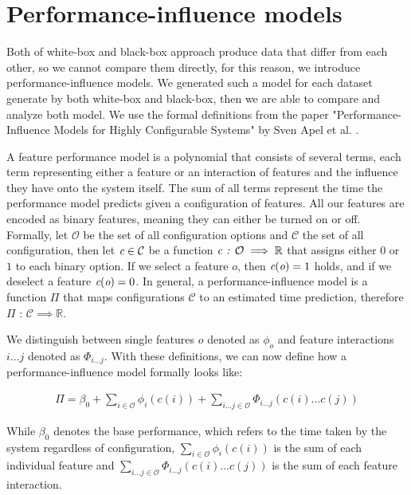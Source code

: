 \section{Performance-influence models}\label{ch:performance-influence-models}

Both of white-box and black-box approach produce data that differ from each other, so we cannot compare them directly, for 
this reason, we introduce performance-influence models. We generated such a model for each dataset generate by both white-box and black-box, then
we are able to compare and analyze both model. We use the formal definitions from the paper "Performance-Influence Models for
Highly Configurable Systems" by Sven Apel et al. \cite{Performance-influence-models-for-highly-configurable-systems}.

A feature performance model is a polynomial that consists of several terms, each term representing either a feature or an interaction
of features and the influence they have onto the system itself. The sum of all terms represent the time the performance model predicts
given a configuration of features. All our features are encoded as binary features, meaning they can either be turned on or off. Formally, 
let $\mathcal{O}$ be the set of all configuration options and $\mathcal{C}$ the set of all configuration, then  let $\emph{c} \in \mathcal{C}$ be
a function $\emph{c} \textit{ : } \mathcal{O} \implies \mathbb{R}$ that assigns either $0$ or $1$ to each binary option. If we select a feature
$o$, then $\emph{c}(\emph{o}) = 1$ holds, and if we deselect a feature $\emph{c}(\emph{o}) = 0$. In general, a performance-influence
model is a function $\Pi$ that maps configurations $\mathcal{C}$ to an estimated time prediction, therefore $\Pi \textit{ : } \mathcal{C} \implies \mathbb{R}$.

We distinguish between single features $o$ denoted as $\phi_o$ and feature interactions $i ... j$ denoted as $\Phi_{i...j}$. With these
definitions, we can now define how a performance-influence model formally looks like:

\begin{gather}
    \Pi = \beta_0 + \sum_{i \in \mathcal{O}} \phi_i(c(i)) + \sum_{i...j \in \mathcal{O}} \Phi_{i...j}(c(i)...c(j))
\end{gather}

While $\beta_0$ denotes the base performance, which refers to the time taken by the system regardless of configuration, $\sum_{i \in \mathcal{O}} \phi_i(c(i))$
is the sum of each individual feature and $\sum_{i...j \in \mathcal{O}} \Phi_{i...j}(c(i)...c(j))$ is the sum of each feature interaction.



